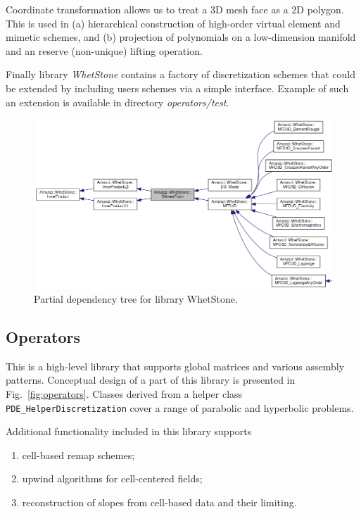 Coordinate transformation allows us to treat a 3D mesh face as a 2D polygon.
This is used in (a) hierarchical construction of high-order virtual element and mimetic 
schemes, and (b) projection of polynomials on a low-dimension manifold and an reserve (non-unique)
lifting operation.

Finally library {\it WhetStone} contains a factory of discretization schemes that could
be extended by including users schemes via a simple interface.
Example of such an extension is available in directory {\it operators/test}.


\begin{figure}[h!]
\includegraphics[width=1.0\textwidth]{figs/whetstone.png}
\caption{Partial dependency tree for library WhetStone.\label{fig:whetstone}}
\end{figure}


\clearpage
\subsection{Operators}
This is a high-level library that supports global matrices and
various assembly patterns.
Conceptual design of a part of this library is presented in Fig.~\ref{fig:operators}.
Classes derived from a helper class {\tt PDE\_HelperDiscretization} cover 
a range of parabolic and hyperbolic problems.

Additional functionality included in this library supports
\begin{enumerate}
\item cell-based remap schemes;
\item upwind algorithms for cell-centered fields;
\item reconstruction of slopes from cell-based data and their limiting.
\end{enumerate}


